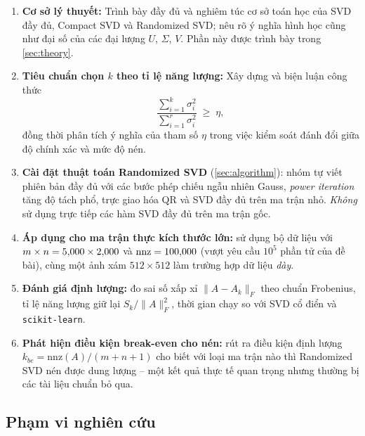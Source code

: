 \begin{enumerate}
    \item \textbf{Cơ sở lý thuyết:} Trình bày đầy đủ và nghiêm túc cơ sở toán
    học của SVD đầy đủ, Compact SVD và Randomized SVD; nêu rõ ý nghĩa
    hình học cũng như đại số của các đại lượng $U$, $\Sigma$, $V$. Phần này
    được trình bày trong \cref{sec:theory}.

    \item \textbf{Tiêu chuẩn chọn $k$ theo tỉ lệ năng lượng:} Xây dựng và
    biện luận công thức
    \[
        \frac{\sum_{i=1}^{k}\sigma_i^2}{\sum_{i=1}^{r}\sigma_i^2} \;\ge\; \eta,
    \]
    đồng thời phân tích ý nghĩa của tham số $\eta$ trong việc kiểm soát đánh
    đổi giữa độ chính xác và mức độ nén.

    \item \textbf{Cài đặt thuật toán Randomized SVD} (\cref{sec:algorithm}):
    nhóm tự viết phiên bản đầy đủ với các bước phép chiếu ngẫu nhiên Gauss,
    \emph{power iteration} tăng độ tách phổ, trực giao hóa QR và SVD đầy đủ
    trên ma trận nhỏ. \emph{Không} sử dụng trực tiếp các hàm SVD đầy đủ trên
    ma trận gốc.

    \item \textbf{Áp dụng cho ma trận thực kích thước lớn:} sử dụng bộ dữ liệu
    \mlSource{} với $m \times n = 5{,}000 \times 2{,}000$ và $\mathrm{nnz} = 100{,}000$
    (vượt yêu cầu $10^5$ phần tử của đề bài), cùng một ảnh xám
    $512\times 512$ làm trường hợp dữ liệu \emph{dày}.

    \item \textbf{Đánh giá định lượng:} đo sai số xấp xỉ
    $\|A - A_k\|_F$ theo chuẩn Frobenius, tỉ lệ năng lượng giữ lại $S_k/\|A\|_F^2$,
    thời gian chạy so với SVD cổ điển và \texttt{scikit-learn}.

    \item \textbf{Phát hiện điều kiện break-even cho nén:} rút ra điều kiện
    định lượng $k_{be} = \mathrm{nnz}(A)/(m+n+1)$ cho biết với loại ma trận
    nào thì Randomized SVD nén được dung lượng -- một kết quả thực tế quan
    trọng nhưng thường bị các tài liệu chuẩn bỏ qua.
\end{enumerate}

\subsection{Phạm vi nghiên cứu}\label{subsec:scope}

